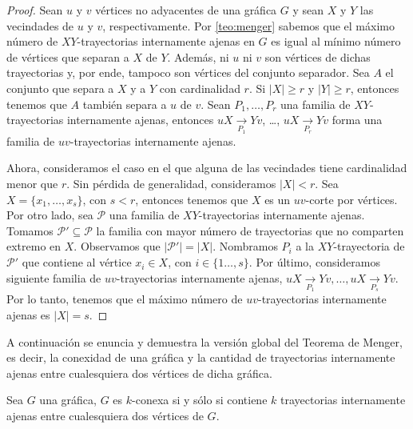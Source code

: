 \begin{proof}
    Sean $u$ y $v$ v\'ertices no adyacentes de una gr\'afica $G$ y sean $X$ y
    $Y$ las vecindades de $u$ y $v$, respectivamente. Por \cref{teo:menger}
    sabemos que el m\'aximo n\'umero de $XY$-trayectorias internamente ajenas en
    $G$ es igual al m\'inimo n\'umero de v\'ertices que separan a $X$ de $Y$.
    Adem\'as, ni $u$ ni $v$ son v\'ertices de dichas trayectorias y, por ende,
    tampoco son v\'ertices del conjunto separador. Sea  $A$ el conjunto que
    separa a $X$ y a $Y$ con cardinalidad $r$. Si $|X| \geq r$ y $|Y| \geq r$,
    entonces tenemos que $A$ tambi\'en separa a $u$ de $v$. Sean $P_1, \dots,
    P_r$ una familia de $XY$-trayectorias internamente ajenas, entonces
    $uX\xrightarrow[P_1]{}Yv$, \dots, $uX\xrightarrow[P_r]{}Yv$ forma una
    familia de $uv$-trayectorias internamente ajenas. 

    Ahora, consideramos el caso en el que alguna de las vecindades tiene
    cardinalidad menor que $r$.  Sin p\'erdida de generalidad, consideramos
    $|X|<r$. Sea $X = \{x_1, \dots, x_s\}$, con $s<r$, entonces tenemos que $X$
    es un $uv$-corte por v\'ertices. Por otro lado, sea $\mathcal{P}$ una
    familia de $XY$-trayectorias internamente ajenas. Tomamos $\mathcal{P'}
    \subseteq \mathcal{P}$ la familia con mayor n\'umero de trayectorias que no
    comparten extremo en $X$. Observamos que $|\mathcal{P'}| = |X|$. Nombramos
    $P_i$ a la $XY$-trayectoria de $\mathcal{P'}$ que contiene al v\'ertice $x_i
    \in X$, con $i \in \{1 \dots, s\}$. Por \'ultimo, consideramos siguiente
    familia de $uv$-trayectorias internamente ajenas, $uX\xrightarrow[P_1]{}Yv,
    \dots, uX\xrightarrow[P_s]{}Yv$. Por lo tanto, tenemos que el m\'aximo
    n\'umero de $uv$-trayectorias internamente ajenas es $|X|=s$.
\end{proof}


A continuaci\'on  se enuncia y demuestra la versi\'on global del Teorema de
Menger, es decir, la conexidad de una gr\'afica y la cantidad de trayectorias
internamente ajenas entre cualesquiera dos v\'ertices de dicha gr\'afica.

\begin{teorema}
    \label{teo:mengerGen}
     Sea $G$ una gr\'afica, $G$ es $k$-conexa si y s\'olo si contiene
     $k$ trayectorias internamente ajenas entre cualesquiera dos v\'ertices de
     $G$.
 \end{teorema}

